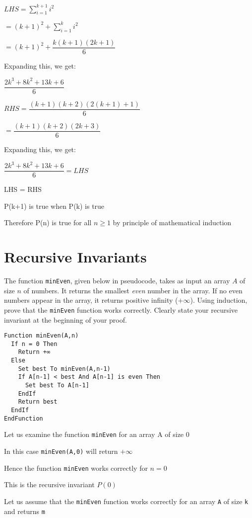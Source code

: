 \documentclass{article}
\begin{document}
    
    $LHS = \sum\limits_{i=1}^{k+1} i^2$
    
    $= {(k+1)}^2 + \sum\limits_{i=1}^{k} i^2 $
    
    $= {(k+1)}^2 + \dfrac{k(k+1)(2k+1)}{6}$
    
    Expanding this, we get:
    
    $\dfrac{2k^3 + 8k^2 + 13k + 6}{6}$
    
    
    $RHS = \dfrac{(k+1)(k+2)(2(k+1)+1)}{6}$
    
    $= \dfrac{(k+1)(k+2)(2k+3)}{6}$
    
    Expanding this, we get:
    
    $\dfrac{2k^3 + 8k^2 + 13k + 6}{6} = LHS$

    LHS = RHS

    P(k+1) is true when P(k) is true


    Therefore P(n) is true for all $n \geq 1$ 
    by principle of mathematical induction




    \vspace{1cm}
    \section{Recursive Invariants}

    The function \texttt{minEven}, given below in pseudocode, takes as input an array $A$ of size $n$ of numbers.  It returns the smallest \textit{even} number in the array.  If no even numbers appear in the array, it returns positive infinity ($+\infty$).  Using induction, prove that the \texttt{minEven} function works correctly.  Clearly state your recursive invariant at the beginning of your proof.

    \begin{verbatim}
Function minEven(A,n)
  If n = 0 Then
    Return +∞
  Else
    Set best To minEven(A,n-1)
    If A[n-1] < best And A[n-1] is even Then
      Set best To A[n-1]
    EndIf
    Return best
  EndIf
EndFunction
    \end{verbatim}

    Let us examine the function \texttt{minEven} for an array A of size 0

    In this case \texttt{minEven(A,0)} will return $+\infty$

    Hence the function \texttt{minEven} works correctly for $n=0$

    This is the recursive invariant ${P(0)}$


    Let us assume that the \texttt{minEven} function works correctly for an array \texttt{A} of size \texttt{k} and returns \texttt{m}
\end{document}
